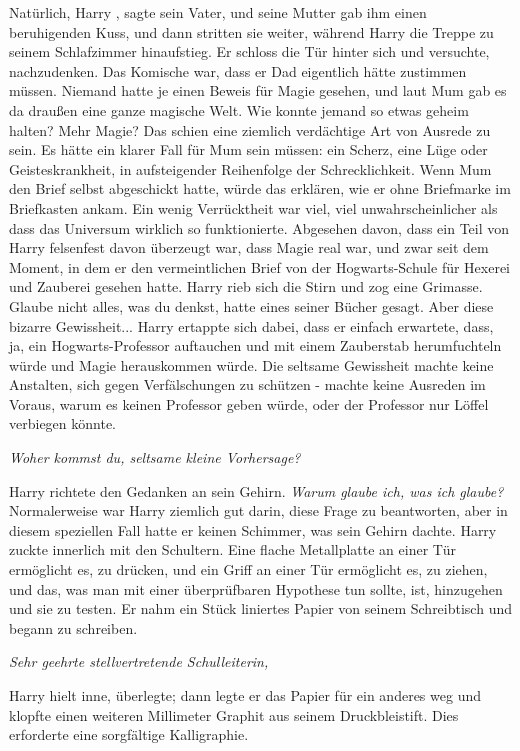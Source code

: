 \glqq Natürlich, Harry\grqq{} , sagte sein Vater, und seine Mutter gab ihm einen
beruhigenden Kuss, und dann stritten sie weiter, während Harry die Treppe zu
seinem Schlafzimmer hinaufstieg. Er schloss die Tür hinter sich und versuchte,
nachzudenken. Das Komische war, dass er Dad eigentlich hätte zustimmen müssen.
Niemand hatte je einen Beweis für Magie gesehen, und laut Mum gab es da draußen
eine ganze magische Welt. Wie konnte jemand so etwas geheim halten? Mehr Magie?
Das schien eine ziemlich verdächtige Art von Ausrede zu sein. Es hätte ein
klarer Fall für Mum sein müssen: ein Scherz, eine Lüge oder Geisteskrankheit, in
aufsteigender Reihenfolge der Schrecklichkeit. Wenn Mum den Brief selbst
abgeschickt hatte, würde das erklären, wie er ohne Briefmarke im Briefkasten
ankam. Ein wenig Verrücktheit war viel, viel unwahrscheinlicher als dass das
Universum wirklich so funktionierte. Abgesehen davon, dass ein Teil von Harry
felsenfest davon überzeugt war, dass Magie real war, und zwar seit dem Moment,
in dem er den vermeintlichen Brief von der Hogwarts-Schule für Hexerei und
Zauberei gesehen hatte. Harry rieb sich die Stirn und zog eine Grimasse. Glaube
nicht alles, was du denkst, hatte eines seiner Bücher gesagt. Aber diese bizarre
Gewissheit... Harry ertappte sich dabei, dass er einfach erwartete, dass, ja,
ein Hogwarts-Professor auftauchen und mit einem Zauberstab herumfuchteln würde
und Magie herauskommen würde. Die seltsame Gewissheit machte keine Anstalten,
sich gegen Verfälschungen zu schützen - machte keine Ausreden im Voraus, warum
es keinen Professor geben würde, oder der Professor nur Löffel verbiegen könnte.

\emph{Woher kommst du, seltsame kleine Vorhersage?}

Harry richtete den Gedanken an sein Gehirn. \emph{Warum glaube ich, was ich
glaube? }Normalerweise war Harry ziemlich gut darin, diese Frage zu beantworten,
aber in diesem speziellen Fall hatte er keinen Schimmer, was sein Gehirn dachte.
Harry zuckte innerlich mit den Schultern. Eine flache Metallplatte an einer Tür
ermöglicht es, zu drücken, und ein Griff an einer Tür ermöglicht es, zu ziehen,
und das, was man mit einer überprüfbaren Hypothese tun sollte, ist, hinzugehen
und sie zu testen. Er nahm ein Stück liniertes Papier von seinem Schreibtisch
und begann zu schreiben.

\emph{Sehr geehrte stellvertretende Schulleiterin, }

Harry hielt inne, überlegte; dann legte er das Papier für ein anderes weg und
klopfte einen weiteren Millimeter Graphit aus seinem Druckbleistift. Dies
erforderte eine sorgfältige Kalligraphie.

